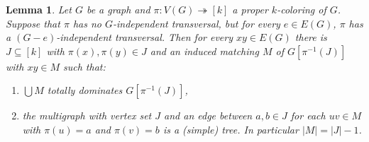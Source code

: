 \documentclass[openany]{tufte-book} %
\theoremstyle{plain}
\newtheorem{lemma}{Lemma}
\newcommand{\card}[1]{\left|#1\right|}
\newcommand{\funcsurj}[3]{#1\colon #2 \twoheadrightarrow #3}
\newcommand{\irange}[1]{\left[#1\right]}
\newcommand{\brackets}[1]{\left[ #1 \right]}
\begin{document}
\begin{lemma}\label{BaseTransversalLemma}
Let $G$ be a graph and $\funcsurj{\pi}{V(G)}{\irange{k}}$ a proper $k$-coloring of
$G$.  Suppose that $\pi$ has no $G$-independent transversal, but for every $e
\in E(G)$, $\pi$ has a $(G-e)$-independent transversal. Then for every $xy \in
E(G)$ there is $J \subseteq \irange{k}$ with $\pi(x), \pi(y) \in J$ and an 
induced matching $M$ of $G\brackets{\pi^{-1}(J)}$ with $xy \in M$ such that:
\begin{enumerate}
  \item $\bigcup M$ totally dominates $G\brackets{\pi^{-1}(J)}$,
  \item the multigraph with vertex set $J$ and an edge between $a, b \in J$ for
  each $uv \in M$ with $\pi(u) = a$ and $\pi(v) = b$ is a (simple) tree.  In
  particular $\card{M} = \card{J} - 1$.
\end{enumerate}
\end{lemma}
\end{document}
